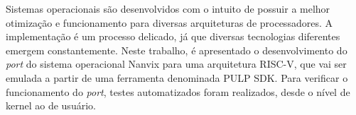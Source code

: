 \begin{resumo}
    Sistemas operacionais são desenvolvidos com o intuito de possuir a melhor otimização e funcionamento para diversas arquiteturas de processadores. A implementação é um processo delicado, já que diversas tecnologias diferentes emergem constantemente. Neste trabalho, é apresentado o desenvolvimento do \textit{port} do sistema operacional Nanvix para uma arquitetura RISC-V, que vai ser emulada a partir de uma ferramenta denominada PULP SDK. Para verificar o funcionamento do \textit{port}, testes automatizados foram realizados, desde o nível de kernel ao de usuário.
\end{resumo}
